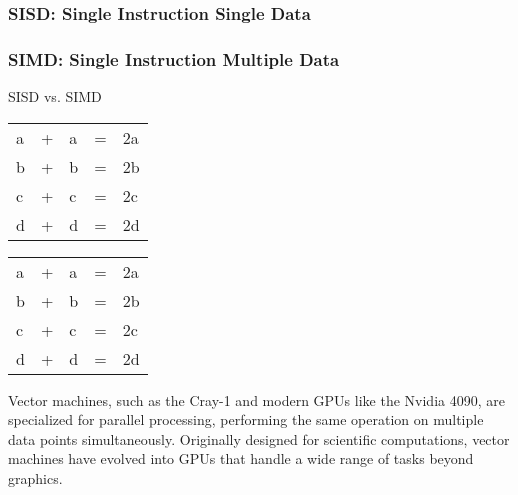 \subsubsection{SISD: Single Instruction Single Data}
\clearpage
\subsubsection{SIMD: Single Instruction Multiple Data}
\begin{center}
    \par \Large{SISD vs. SIMD}   
\end{center}
    \begin{table}[h]
    \centering
    \begin{tabular}{|l|l|l|l|l|}
    \cline{1-1} \cline{3-3} \cline{5-5}
    a & + & a & = & 2a \\ \cline{1-1} \cline{3-3} \cline{5-5} 
    b & + & b & = & 2b \\ \cline{1-1} \cline{3-3} \cline{5-5} 
    c & + & c & = & 2c \\ \cline{1-1} \cline{3-3} \cline{5-5} 
    d & + & d & = & 2d \\ \cline{1-1} \cline{3-3} \cline{5-5} 
    \end{tabular}
    \hspace{1cm}
    \begin{tabular}{|l|l|l|l|l|}
\cline{1-1} \cline{3-3} \cline{5-5}
a & + & a & = & 2a \\
b & + & b & = & 2b \\
c & + & c & = & 2c \\
d & + & d & = & 2d \\ \cline{1-1} \cline{3-3} \cline{5-5} 
\end{tabular}
    \end{table}
\par Vector machines, such as the Cray-1 and modern GPUs like the Nvidia 4090, are specialized for parallel processing, performing the same operation on multiple data points simultaneously. Originally designed for scientific computations, vector machines have evolved into GPUs that handle a wide range of tasks beyond graphics.
